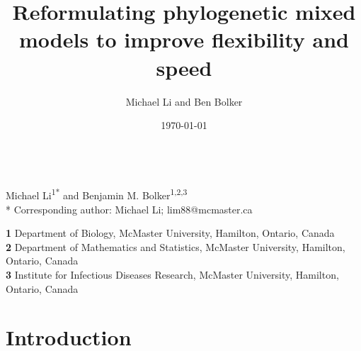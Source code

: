 \documentclass[12pt]{article}
\title{Reformulating phylogenetic mixed models to improve flexibility and speed}
\author{Michael Li and Ben Bolker}
\date{\today}
\date{}
\begin{document}
\newcommand{\dbic}{\ensuremath \Delta \textrm{BIC}}

\newcommand{\bmbhide}[1]{}
\newcommand{\bmb}[1]{{\color{blue} BB: #1}}


\renewcommand{\figurename}{Fig.}

\newcommand{\mli}[1]{{\color{red} ML: #1}}

\newcommand{\add}[1]{{\color{blue} ADD: #1}}


\newcommand{\pkg}[1]{{\tt #1}}
\newcommand{\code}[1]{{\tt #1}}


\linenumbers





\begin{center}
{\Large
\textbf{} %
}
\\
\vspace{2pt}
Michael Li\textsuperscript{1*} and Benjamin M. Bolker\textsuperscript{1,2,3}
\\
\vspace{2pt}
* Corresponding author: Michael Li; lim88@mcmaster.ca
\end{center}
\vspace{5pt}
\textbf{1} Department of Biology, McMaster University, Hamilton, Ontario, Canada
\\
\textbf{2} Department of Mathematics and Statistics, McMaster University, Hamilton, Ontario, Canada
\\
\textbf{3} Institute for Infectious Diseases Research, McMaster University, Hamilton, Ontario, Canada
\\
\bigskip

\doublespacing



\section*{Introduction}
\end{document}
